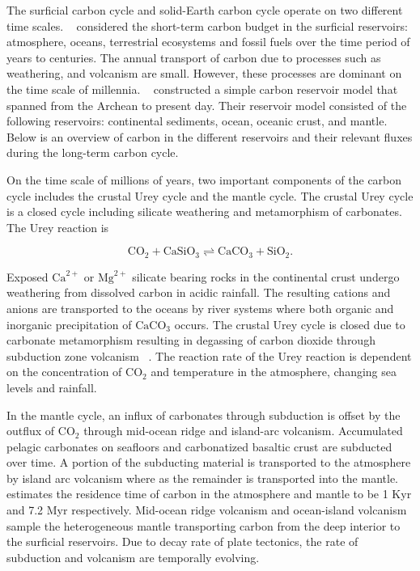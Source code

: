 The surficial carbon cycle and solid-Earth carbon cycle operate on two different time scales. ~\cite{HRA:2007} considered the short-term carbon budget in the surficial reservoirs: atmosphere, oceans, terrestrial ecosystems and fossil fuels over the time period of years to centuries. The annual transport of carbon due to processes such as weathering, and volcanism are small. However, these processes are dominant on the time scale of millennia. ~\citet{SNH-ZK:2001} constructed a simple carbon reservoir model that spanned from the Archean to present day. Their reservoir model consisted of the following reservoirs: continental sediments, ocean, oceanic crust, and mantle. Below is an overview of carbon in the different reservoirs and their relevant fluxes during the long-term carbon cycle.

On the time scale of millions of years, two important components of the carbon cycle includes the crustal Urey cycle and the mantle cycle. The crustal Urey cycle is a closed cycle including silicate weathering and metamorphism of carbonates. The Urey reaction is 

\begin{equation}
\label{EQ:Urey_reaction}
  \text{CO}_2 + \text{CaSiO}_3 \rightleftharpoons \text{CaCO}_3 + \text{SiO}_2.
\end{equation}

\noindent Exposed $\mathrm{Ca}^{2+}$ or $\mathrm{Mg}^{2+}$ silicate bearing rocks in the continental crust undergo weathering from dissolved carbon in acidic rainfall. The resulting cations and anions are transported to the oceans by river systems where both organic and inorganic precipitation of $\text{CaCO}_3$ occurs. The crustal Urey cycle is closed due to carbonate metamorphism resulting in degassing of carbon dioxide through subduction zone volcanism ~\cite{KLH-TDL-WM:2018}. The reaction rate of the Urey reaction is dependent on the concentration of $\text{CO}_2$ and temperature in the atmosphere, changing sea levels and rainfall.

In the mantle cycle, an influx of carbonates through subduction is offset by the outflux of $\text{CO}_2$ through mid-ocean ridge and island-arc volcanism.  Accumulated pelagic carbonates on seafloors and carbonatized basaltic crust are subducted over time. A portion of the subducting material is transported to the atmosphere by island arc volcanism where as the remainder is transported into the mantle. ~\citet{SNH-ZK:2001} estimates the residence time of carbon in the atmosphere and mantle to be 1 Kyr and 7.2 Myr respectively. Mid-ocean ridge volcanism and ocean-island volcanism sample the heterogeneous mantle transporting carbon from the deep interior to the surficial reservoirs. Due to decay rate of plate tectonics, the rate of subduction and volcanism are temporally evolving.

